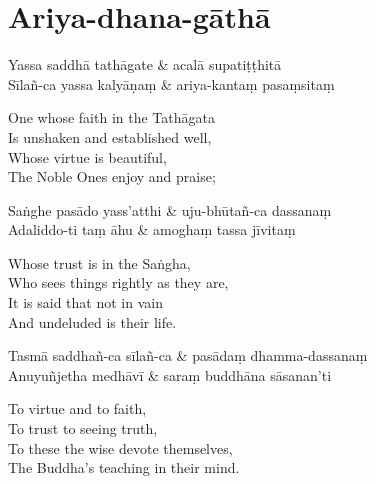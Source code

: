 \section{Ariya-dhana-gāthā}



\begin{twochants}
Yassa saddhā tathāgate & acalā supatiṭṭhitā\\
Sīlañ-ca yassa kalyāṇaṃ & ariya-kantaṃ pasaṃsitaṃ\\
\end{twochants}

\begin{english}
  One whose faith in the Tathāgata\\
  Is unshaken and established well,\\
  Whose virtue is beautiful,\\
  The Noble Ones enjoy and praise;
\end{english}

\begin{twochants}
Saṅghe pasādo yass'atthi & uju-bhūtañ-ca dassanaṃ\\
Adaliddo-ti taṃ āhu & amoghaṃ tassa jīvitaṃ\\
\end{twochants}

\begin{english}
  Whose trust is in the Saṅgha,\\
  Who sees things rightly as they are,\\
  It is said that not in vain\\
  And undeluded is their life.
\end{english}

\begin{twochants}
Tasmā saddhañ-ca sīlañ-ca & pasādaṃ dhamma-dassanaṃ\\
Anuyuñjetha medhāvī & saraṃ buddhāna sāsanan'ti
\end{twochants}

\begin{english}
  To virtue and to faith,\\
  To trust to seeing truth,\\
  To these the wise devote themselves,\\
  The Buddha's teaching in their mind.
\end{english}

